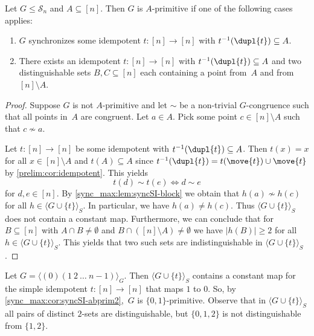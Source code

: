 \begin{corollary} \label{sync_max:cor:syncSI-abprim1} \label{sync_max:cor:syncSI-abprim2}	
	Let $G \le \mathcal S_n$ and $A \subseteq [n]$. Then $G$ is $A$-primitive
	if one of the following cases applies:
	
	\begin{enumerate}
	\item $G$ synchronizes some idempotent $t \colon [n] \to [n]$ with $t^{-1}(\dupl{t}) \subseteq A$.
	
	\item There exists an idempotent $t \colon [n] \to [n]$ with $t^{-1}(\dupl{t}) \subseteq A$
	and two distinguishable sets $B, C \subseteq [n]$ each containing a point from~$A$
	and from $[n] \setminus A$.	
	\end{enumerate}
\end{corollary}
\begin{proof}
Suppose $G$ is not $A$-primitive and let $\sim$ be a non-trivial $G$-congruence
such that all points in~$A$ are congruent.
Let $a \in A$.
Pick some point $c \in [n] \setminus A$ such that $c \not\sim a$.

Let $t \colon [n] \to [n]$ be some idempotent with $t^{-1}(\dupl{t}) \subseteq A$.
Then $t(x) = x$ for all $x \in [n] \setminus A$
and $t(A) \subseteq A$ since $t^{-1}(\dupl{t}) = t(\move{t}) \cup \move{t}$ by \cref{prelim:cor:idempotent}.
This yields
\[
 t(d) \sim t(e) \Leftrightarrow d \sim e
\]
for $d,e \in [n]$. By \cref{sync_max:lem:syncSI-block} we obtain 
that $h(a) \not\sim h(c)$ for all $h \in \langle G \cup \{t\} \rangle_S$.
In particular, we have $h(a) \ne h(c)$.
Thus $\langle G \cup \{t\}\rangle_S$ does not contain a constant map.
Furthermore, we can conclude that for $B \subseteq [n]$ with $A \cap B \ne \emptyset$
and $B \cap ( [n] \setminus A ) \ne \emptyset$
we have $|h(B)| \ge 2$ for all $h \in \langle G \cup \{t\} \rangle_S$.
This yields that two such sets are indistinguishable in $\langle G \cup \{t\} \rangle_S$.
\end{proof}	
	
	
	\begin{example}\label{sync_max:ex:abprim-constant-not-transitive}
		Let $G = \langle (0)(1 ~ 2 ~ \ldots ~ n - 1) \rangle_G$.
		Then $\langle G \cup \{t\} \rangle_S$ contains a constant map
		for the simple idempotent $t\colon [n]\to [n]$ that maps $1$ to $0$.
		So, by \cref{sync_max:cor:syncSI-abprim2},~$G$ is $\{0,1\}$-primitive.
		Observe that in $\langle G \cup \{t\} \rangle_S$ all pairs of distinct $2$-sets are distinguishable, but
		$\{0,1,2\}$ is not distinguishable from $\{1,2\}$.
	\end{example} 
		
